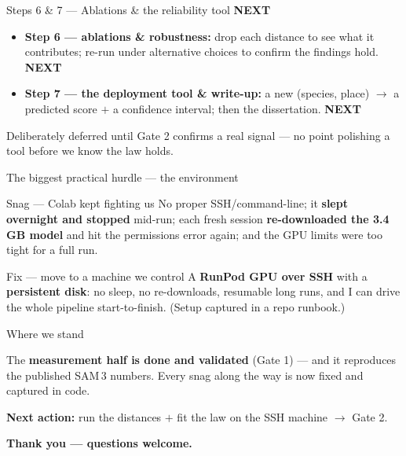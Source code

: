 \documentclass[aspectratio=169,11pt]{beamer}
\newcommand{\badge}[2]{\colorbox{#1!20}{\small\color{#1}\textbf{#2}}}
\newcommand{\nx}{\badge{burnt}{NEXT}}
\begin{document}
\begin{frame}{Steps 6 \& 7 --- Ablations \& the reliability tool \hfill \nx}
  \begin{itemize}
    \item \textbf{Step 6 --- ablations \& robustness:} drop each distance to see what it contributes; re-run
          under alternative choices to confirm the findings hold. \nx
    \item \textbf{Step 7 --- the deployment tool \& write-up:} a new (species, place) $\to$ a predicted
          score $+$ a confidence interval; then the dissertation. \nx
  \end{itemize}
  \vspace{0.4em}
  \begin{block}{}
    \centering\footnotesize Deliberately deferred until Gate 2 confirms a real signal --- no point polishing
    a tool before we know the law holds.
  \end{block}
\end{frame}

\begin{frame}{The biggest practical hurdle --- the environment}
  \begin{block}{Snag --- Colab kept fighting us}\footnotesize
    No proper SSH/command-line; it \textbf{slept overnight and stopped} mid-run; each fresh session
    \textbf{re-downloaded the 3.4\,GB model} and hit the permissions error again; and the GPU limits were
    too tight for a full run.
  \end{block}
  \vspace{0.3em}
  \begin{block}{Fix --- move to a machine we control}\footnotesize
    A \textbf{RunPod GPU over SSH} with a \textbf{persistent disk}: no sleep, no re-downloads, resumable
    long runs, and I can drive the whole pipeline start-to-finish. (Setup captured in a repo runbook.)
  \end{block}
\end{frame}

\begin{frame}{Where we stand}
  \begin{block}{}
    \centering The \textbf{measurement half is done and validated} (Gate 1) --- and it reproduces the
    published SAM\,3 numbers. Every snag along the way is now fixed and captured in code.
  \end{block}
  \vspace{0.5em}
  \centering
  \textbf{Next action:} run the distances $+$ fit the law on the SSH machine $\to$ \textcolor{burnt}{Gate 2}.
  \vspace{0.6em}

  {\small\color{navy}\textbf{Thank you --- questions welcome.}}
\end{frame}
\end{document}

